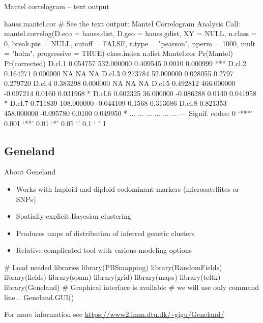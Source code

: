 \documentclass[compress, ucs, xelatex, 11pt, xcolor=svgnames,
  hyperref={
    bookmarks=true,
    unicode=true,
    colorlinks=true,
    pdftitle={Molecular data in R},
    plainpages=false,
    pdfauthor={Vojtech Zeisek},
    pdfsubject={Course about phylogeny and evolution in R},
    pdfcreator={XeLaTeX},
    pdfkeywords={R, evolution, phylogeny, molecular data},
    linkcolor=Tomato,
    anchorcolor=SaddleBrown,
    citecolor=Goldenrod,
    filecolor=DarkMagenta,
    menucolor=Sienna,
    urlcolor=DarkTurquoise,
    pdftex},
  url={hyphens, lowtilde} %
  ]{beamer}
\begin{document}
\begin{frame}[fragile]{Mantel correlogram -- text output}
  \begin{spluscode}
    hauss.mantel.cor # See the text output:
    Mantel Correlogram Analysis
    Call:
    mantel.correlog(D.eco = hauss.dist, D.geo = hauss.gdist, XY = NULL,
     n.class = 0, break.pts = NULL, cutoff = FALSE, r.type = "pearson",
     nperm = 1000, mult = "holm", progressive = TRUE) 
            class.index     n.dist Mantel.cor Pr(Mantel) Pr(corrected)
    D.cl.1     0.054757 532.000000   0.409545     0.0010      0.000999 ***
    D.cl.2     0.164271   0.000000         NA         NA            NA
    D.cl.3     0.273784  52.000000   0.028055     0.2797      0.279720
    D.cl.4     0.383298   0.000000         NA         NA            NA
    D.cl.5     0.492812 466.000000  -0.097214     0.0160      0.031968 *
    D.cl.6     0.602325  36.000000  -0.086288     0.0140      0.041958 *
    D.cl.7     0.711839 108.000000  -0.044109     0.1568      0.313686
    D.cl.8     0.821353 458.000000  -0.095780     0.0100      0.049950 *
    ...        ...      ...         ...           ...         ...
    ---
    Signif. codes:  0 ‘***’ 0.001 ‘**’ 0.01 ‘*’ 0.05 ‘.’ 0.1 ‘ ’ 1
  \end{spluscode}
\end{frame}

\subsection{Geneland}

\begin{frame}[fragile]{About Geneland}
\begin{multicols}{2}
  \begin{itemize}
    \item Works with haploid and diploid codominant markers (microsatellites or SNPs)
    \item Spatially explicit Bayesian clustering
    \item Produces maps of distribution of inferred genetic clusters
    \item Relative complicated tool with various modeling options
  \end{itemize}
  \columnbreak
  \begin{spluscode}
    # Load needed libraries
    library(PBSmapping)
    library(RandomFields)
    library(fields)
    library(spam)
    library(grid)
    library(maps)
    library(tcltk)
    library(Geneland)
    # Graphical interface is available
    # we will use only command line...
    Geneland.GUI()
  \end{spluscode}
\end{multicols}
For more information see \url{https://www2.imm.dtu.dk/~gigu/Geneland/}
\end{frame}
\end{document}

